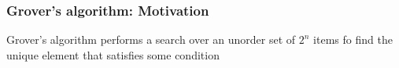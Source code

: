 \begin{frame}
\frametitle{Grover's algorithm: Motivation}
Grover's algorithm performs a search over an unorder set of $2^n$ items fo find the unique element that satisfies some condition

\end{frame}